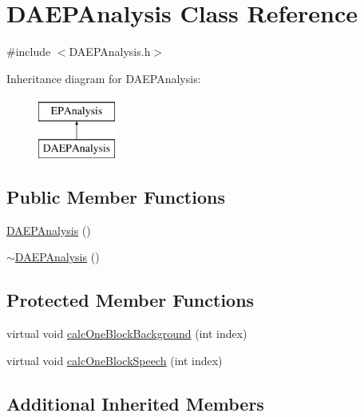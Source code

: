 \hypertarget{class_d_a_e_p_analysis}{\section{D\+A\+E\+P\+Analysis Class Reference}
\label{class_d_a_e_p_analysis}
}


{\ttfamily \#include $<$D\+A\+E\+P\+Analysis.\+h$>$}

Inheritance diagram for D\+A\+E\+P\+Analysis\+:\begin{figure}[H]
\begin{center}
\leavevmode
\includegraphics[height=2.000000cm]{class_d_a_e_p_analysis}
\end{center}
\end{figure}
\subsection*{Public Member Functions}
\begin{DoxyCompactItemize}
\item 
\hyperlink{class_d_a_e_p_analysis_a543fae6145bccbf58f2930501fc76f05}{D\+A\+E\+P\+Analysis} ()
\item 
\hyperlink{class_d_a_e_p_analysis_a422717d446880c140110d51610c0c571}{$\sim$\+D\+A\+E\+P\+Analysis} ()
\end{DoxyCompactItemize}
\subsection*{Protected Member Functions}
\begin{DoxyCompactItemize}
\item 
virtual void \hyperlink{class_d_a_e_p_analysis_af2b91e8bd16a65ec962b748bbf27952a}{calc\+One\+Block\+Background} (int index)
\item 
virtual void \hyperlink{class_d_a_e_p_analysis_ae9996fd139ffd800e5a5be4315b50942}{calc\+One\+Block\+Speech} (int index)
\end{DoxyCompactItemize}
\subsection*{Additional Inherited Members}


